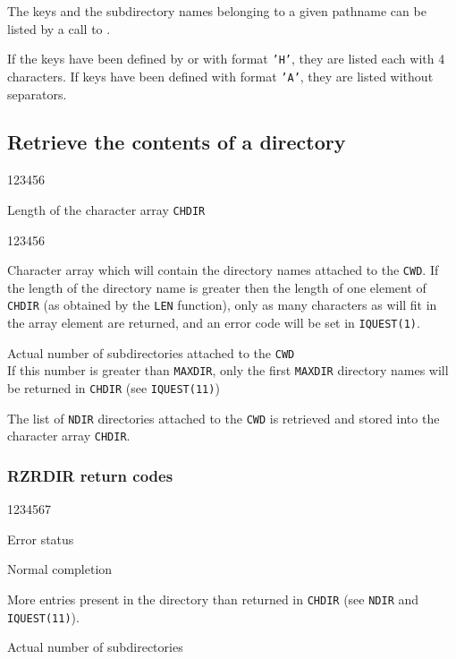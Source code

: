 The keys and the subdirectory names belonging to a given pathname can
be listed by a call to .

If the keys have been defined by  or 
with format {\tt'H'},
they are listed each with 4 characters. If keys have been defined
with format {\tt'A'}, they are listed without separators.


\subsection{Retrieve the contents of a directory}
\Idesc
\begin{DLtt}{123456}
\item[MAXDIR]Length of the character array {\tt CHDIR}
\end{DLtt}
\Odesc
\begin{DLtt}{123456}
\item[CHDIR*]Character array which will contain the directory names attached to
the {\tt CWD}. If the length of the directory name is greater then the length
of one element of {\tt CHDIR} (as obtained by the {\tt LEN} function), only
as many characters as will fit in the array element are returned, and
an error code will be set in {\tt IQUEST(1)}.
\item[NDIR*]Actual number of subdirectories attached to the {\tt CWD}\\
If this number is greater than {\tt MAXDIR}, only the first
{\tt MAXDIR} directory names will be returned in {\tt CHDIR}
(see {\tt IQUEST(11)})
\end{DLtt}

The list of {\tt NDIR} directories attached to the {\tt CWD} is 
retrieved and stored into the character array {\tt CHDIR}.

\subsubsection*{RZRDIR return codes}
\begin{DLtt}{1234567}
\item[IQUEST(1)]Error status
\begin{DLtt}{1}
\item[0]Normal completion
\item[1]More entries present in the directory than returned in {\tt CHDIR}
(see {\tt NDIR} and {\tt IQUEST(11)}).
\end{DLtt}
\item[IQUEST(11)]Actual number of subdirectories
\end{DLtt}

